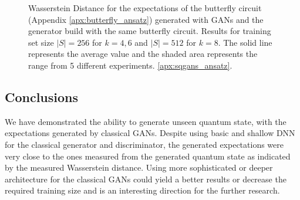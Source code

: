 \begin{figure}[htbp!]
  \captionsetup[subfigure]{labelformat=empty}
  \centering
  \caption{Wasserstein Distance for the expectations of the butterfly circuit
    (Appendix \ref{apx:butterfly_ansatz}) generated with GANs and the generator
    build with the same butterfly circuit. Results
    for training set size $|S| = 256$ for $k=4,6$ and $|S| = 512$ for $k=8$. 
    The solid line represents the average value and the shaded area
    represents the range from 5 different experiments. 
    \ref{apx:sqgans_ansatz}. }
  \label{fig:wqgans_res_gans_1}
\end{figure}

\subsection{Conclusions}
We have demonstrated the ability to generate unseen quantum state, with the
expectations generated by classical GANs. Despite using basic and shallow DNN
for the classical generator and discriminator, the generated expectations were
very close to the ones measured from the generated quantum state as indicated by
the measured Wasserstein distance. Using more sophisticated or deeper architecture
for the classical GANs could yield a better results or decrease the required training
size and is an interesting direction for the further research. 

